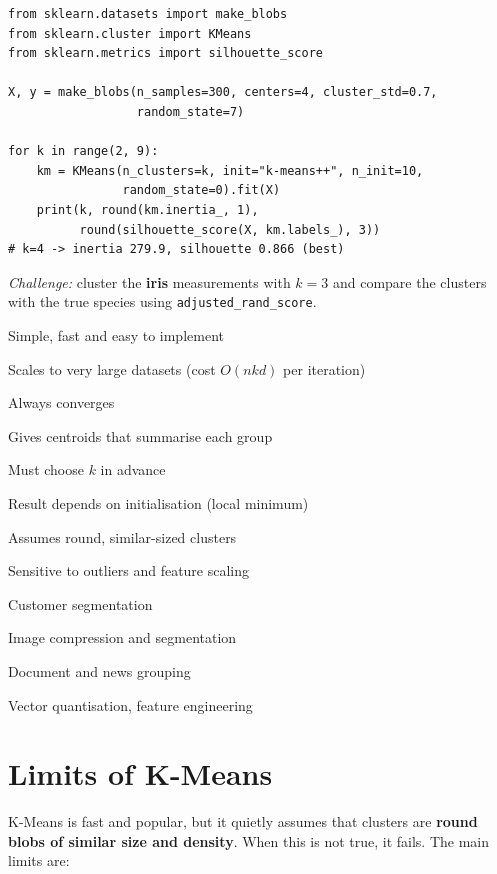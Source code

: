\begin{tryit}
\begin{lstlisting}
from sklearn.datasets import make_blobs
from sklearn.cluster import KMeans
from sklearn.metrics import silhouette_score

X, y = make_blobs(n_samples=300, centers=4, cluster_std=0.7,
                  random_state=7)

for k in range(2, 9):
    km = KMeans(n_clusters=k, init="k-means++", n_init=10,
                random_state=0).fit(X)
    print(k, round(km.inertia_, 1),
          round(silhouette_score(X, km.labels_), 3))
# k=4 -> inertia 279.9, silhouette 0.866 (best)
\end{lstlisting}
\emph{Challenge:} cluster the \textbf{iris} measurements with $k=3$ and compare the clusters with the true species using \texttt{adjusted\_rand\_score}.
\end{tryit}

{\item Simple, fast and easy to implement
 \item Scales to very large datasets (cost $O(nkd)$ per iteration)
 \item Always converges
 \item Gives centroids that summarise each group}
{\item Must choose $k$ in advance
 \item Result depends on initialisation (local minimum)
 \item Assumes round, similar-sized clusters
 \item Sensitive to outliers and feature scaling}
{\item Customer segmentation
 \item Image compression and segmentation
 \item Document and news grouping
 \item Vector quantisation, feature engineering}

\section{Limits of K-Means}

K-Means is fast and popular, but it quietly assumes that clusters are \textbf{round blobs of similar size and density}. When this is not true, it fails. The main limits are:

